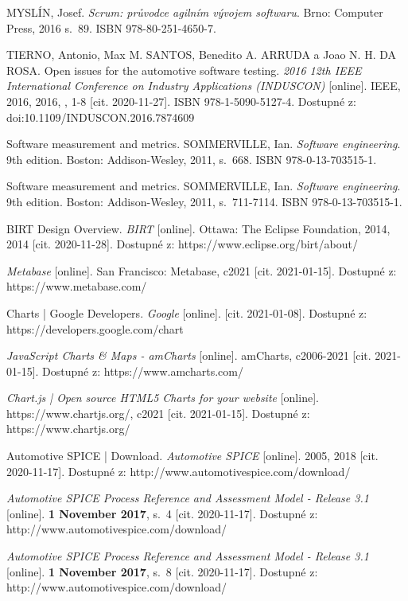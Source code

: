 \documentclass[czech,master]{diploma}
\begin{document}
\begin{thebibliography}{43}
MYSLÍN, Josef. \textit{Scrum: průvodce agilním vývojem softwaru}. Brno: Computer Press, 2016 s.~89. ISBN 978-80-251-4650-7.

TIERNO, Antonio, Max M. SANTOS, Benedito A. ARRUDA a Joao N. H. DA ROSA. Open issues for the automotive software testing. \textit{2016 12th IEEE International Conference on Industry Applications (INDUSCON)} [online]. IEEE, 2016, 2016, , 1-8 [cit. 2020-11-27]. ISBN 978-1-5090-5127-4. Dostupné z: doi:10.1109/INDUSCON.2016.7874609

Software measurement and metrics. SOMMERVILLE, Ian. \textit{Software engineering}. 9th edition. Boston: Addison-Wesley, 2011, s.~668. ISBN 978-0-13-703515-1.


Software measurement and metrics. SOMMERVILLE, Ian. \textit{Software engineering}. 9th edition. Boston: Addison-Wesley, 2011, s.~711-7114. ISBN 978-0-13-703515-1.

BIRT Design Overview. \textit{BIRT} [online]. Ottawa: The Eclipse Foundation, 2014, 2014 [cit. 2020-11-28]. Dostupné z: https://www.eclipse.org/birt/about/

\textit{Metabase} [online]. San Francisco: Metabase, c2021 [cit. 2021-01-15]. Dostupné z: https://www.metabase.com/

Charts | Google Developers. \textit{Google} [online]. [cit. 2021-01-08]. Dostupné z: https://developers.google.com/chart

\textit{JavaScript Charts \& Maps - amCharts} [online]. amCharts, c2006-2021 [cit. 2021-01-15]. Dostupné z: https://www.amcharts.com/

\textit{Chart.js | Open source HTML5 Charts for your website} [online]. https://www.chartjs.org/, c2021 [cit. 2021-01-15]. Dostupné z: https://www.chartjs.org/

Automotive SPICE | Download. \textit{Automotive SPICE} [online]. 2005, 2018 [cit. 2020-11-17]. Dostupné z: http://www.automotivespice.com/download/

\textit{Automotive SPICE Process Reference and Assessment Model - Release 3.1} [online]. \textbf{1 November 2017}, s.~4 [cit. 2020-11-17]. Dostupné z: http://www.automotivespice.com/download/

\textit{Automotive SPICE Process Reference and Assessment Model - Release 3.1} [online]. \textbf{1 November 2017}, s.~8 [cit. 2020-11-17]. Dostupné z: http://www.automotivespice.com/download/


\end{thebibliography}
\end{document}
